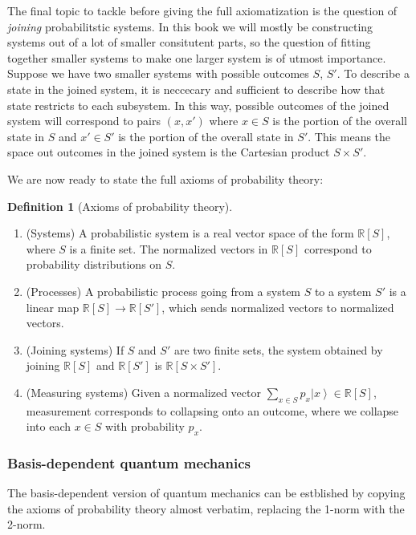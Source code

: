 \documentclass{article}
\theoremstyle{definition}
\newtheorem*{definition}{Definition}
\newcommand{\RR}{\mathbb{R}}
\newcommand{\0}{\left|0\right>}
\newcommand{\1}{\left|1\right>}
\numberwithin{figure}{section}
\begin{document}
The final topic to tackle before giving the full axiomatization is the question of \textit{joining} probabilitstic systems. In this book we will mostly be constructing systems out of a lot of smaller consitutent parts, so the question of fitting together smaller systems to make one larger system is of utmost importance. Suppose we have two smaller systems with possible outcomes $S$, $S'$. To describe a state in the joined system, it is neccecary and sufficient to describe how that state restricts to each subsystem. In this way, possible outcomes of the joined system will correspond to pairs $(x,x')$ where $x\in S$ is the portion of the overall state in $S$ and $x'\in S'$ is the portion of the overall state in $S'$. This means the space out outcomes in the joined system is the Cartesian product $S\times S'$.

We are now ready to state the full axioms of probability theory:

\begin{definition}[Axioms of probability theory] $\,$

\begin{enumerate}
\item (Systems) A probabilistic system is a real vector space of the form $\RR[S]$, where $S$ is a finite set. The normalized vectors in $\RR[S]$ correspond to probability distributions on $S$.
\item (Processes) A probabilistic process going from a system $S$ to a system $S'$ is a linear map $\RR[S]\to \RR[S']$, which sends normalized vectors to normalized vectors.
\item (Joining systems) If $S$ and $S'$ are two finite sets, the system obtained by joining $\RR[S]$ and $\RR[S']$ is $\RR[S\times S']$.
\item (Measuring systems) Given a normalized vector $\sum_{x\in S}p_x \left |x\right>\in \RR[S]$, measurement corresponds to collapsing onto an outcome, where we collapse into each $x\in S$ with probability $p_x$.
\end{enumerate}

\raggedleft\qedsymbol{}
\end{definition}

\subsubsection{Basis-dependent quantum mechanics}

The basis-dependent version of quantum mechanics can be estblished by copying the axioms of probability theory almost verbatim, replacing the 1-norm with the 2-norm.
\end{document}
